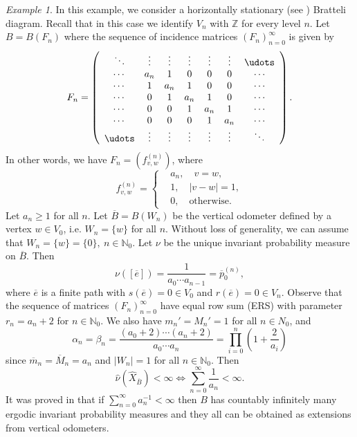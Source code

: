 \documentclass[11pt,reqno]{amsart}
\theoremstyle{definition}
\theoremstyle{remark}
\newtheorem{example}[definition]{Example}
\theoremstyle{plain}
\def\ov{\overline}
\def\wh{\widehat}
\newcommand{\N}{\mathbb N}
\newcommand{\Z}{\mathbb Z}
\numberwithin{equation}{section}
\begin{document}
\begin{example}\label{Ex_hor_stat_IO}
In this example, we consider a horizontally stationary (see ) Bratteli diagram. Recall that in this case we identify $V_n$ with $\Z$ for every level $n$.
Let $B = B(F_n)$ where the sequence of incidence matrices $(F_n)_{n=0}^{\infty}$ is given by
$$
F_n = \left(
\begin{array}{cccccccccccc}
        \ddots & \vdots & \vdots & \vdots & \vdots & \vdots & \udots\\
\cdots & a_n & 1 & 0 & 0 & 0 & \cdots\\
\cdots & 1 & a_n & 1 & 0 & 0 & \cdots\\
\cdots & 0& 1 & a_n & 1 & 0 & \cdots\\
\cdots & 0 & 0 &  1 & a_n & 1 & \cdots\\
\cdots & 0 & 0 & 0 &  1 & a_n & \cdots\\
        \udots & \vdots & \vdots & \vdots & \vdots & \vdots & \ddots\\
\end{array}
\right).
$$
In other words, we have $F_n = (f_{v,w}^{(n)})$, where
$$
f_{v,w}^{(n)} =
\left\{
\begin{aligned}
&a_n, \quad v = w,\\
&1, \quad |v - w| = 1,\\
&0, \quad \text{otherwise}.
\end{aligned}
\right.
$$
Let $a_n \geq 1$ for all $n$. Let $\ov B = B(W_n)$ be the vertical odometer defined by a vertex $w \in V_0$, i.e. $W_n = \{w\}$ for all $n$. Without loss of generality, we can assume that $W_n = \{w\} = \{0\}, \ n \in \N_0$. Let $\nu$ be the unique invariant probability measure on $\ov B$. Then
$$
\nu([\ov e]) = \frac{1}{a_0 \cdots a_{n-1}} = \ov p_0^{(n)}, 
$$ 
where $\ov e$ is a finite path with $s(\ov e) = 0 \in V_0$ and  $r(\ov e) = 0 \in V_n$. Observe that the sequence of matrices $(F_n)_{n=0}^{\infty}$ have equal row sum (ERS) with parameter $r_n = a_n + 2$ for $n \in \N_0$. We also have $m_n' = M_n' = 1$ for all $n \in N_0$, and 
$$
\alpha_n = \beta_n = \frac{(a_0 + 2)\cdots(a_n + 2)}{a_0 \cdots a_n} = \prod_{i = 0}^n\left(1 + \frac{2}{a_i}\right)
$$
since $\ov m_n = \ov M_n = a_n$ and $|W_n| = 1$ for all $n \in \N_0$. Then
$$
\wh \nu(\wh X_{\ov B}) < \infty \Longleftrightarrow \sum_{n = 0}^{\infty} \frac{1}{a_n} < \infty.
$$
It was proved in \cite[Theorem 4.5]{BezuglyiJorgensenKarpelKwiatkowski2025} that if $\sum_{n = 0}^{\infty} {a_n^{-1}} < \infty$ then $B$ has countably infinitely many ergodic invariant probability measures and they all can be obtained as extensions from vertical odometers.
\end{example}
\end{document}
